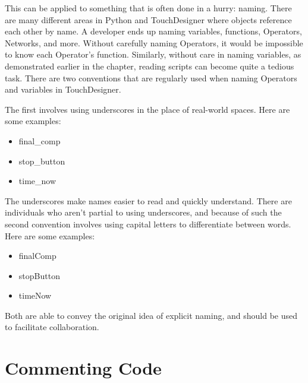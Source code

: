 \begin{fullwidth}
This can be applied to something that is often done in a hurry: naming. There are many different areas in Python and TouchDesigner where objects reference each other by name. A developer ends up naming variables, functions, Operators, Networks, and more. Without carefully naming Operators, it would be impossible to know each Operator's function. Similarly, without care in naming variables, as demonstrated earlier in the chapter, reading scripts can become quite a tedious task. There are two conventions that are regularly used when naming Operators and variables in TouchDesigner. 

The first involves using underscores in the place of real-world spaces. Here are some examples:

\begin{itemize}
\item final\_comp
\item stop\_button
\item time\_now
\end{itemize}

The underscores make names easier to read and quickly understand. There are individuals who aren't partial to using underscores, and because of such the second convention involves using capital letters to differentiate between words. Here are some examples:

\begin{itemize}
\item finalComp
\item stopButton
\item timeNow
\end{itemize}

Both are able to convey the original idea of explicit naming, and should be used to facilitate collaboration.

\end{fullwidth}


\section{Commenting Code}

